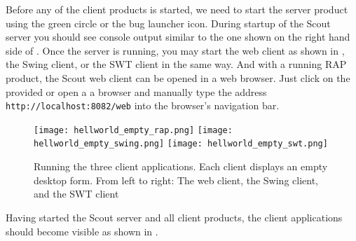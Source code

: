 Before any of the client products is started, we need to start the server product using the green circle or the bug launcher icon.
During startup of the Scout server you should see console output similar to the one shown on the right hand side of .
Once the server is running, you may start the web client as shown in , the Swing client, or the SWT client in the same way.
And with a running RAP product, the Scout web client can be opened in a web browser.
Just click on the provided  or open a a browser and manually type the address \texttt{http://localhost:8082/web} into the browser's navigation bar.

\begin{figure}
\texttt{[image: hellworld\_empty\_rap.png]} \hspace{3mm}
\texttt{[image: hellworld\_empty\_swing.png]} \hspace{3mm}
\texttt{[image: hellworld\_empty\_swt.png]}
\caption{Running the three client applications. 
Each client displays an empty desktop form. 
From left to right: The web client, the Swing client, and the SWT client}
\end{figure}

Having started the Scout server and all client products, the client applications should become visible as shown in .

